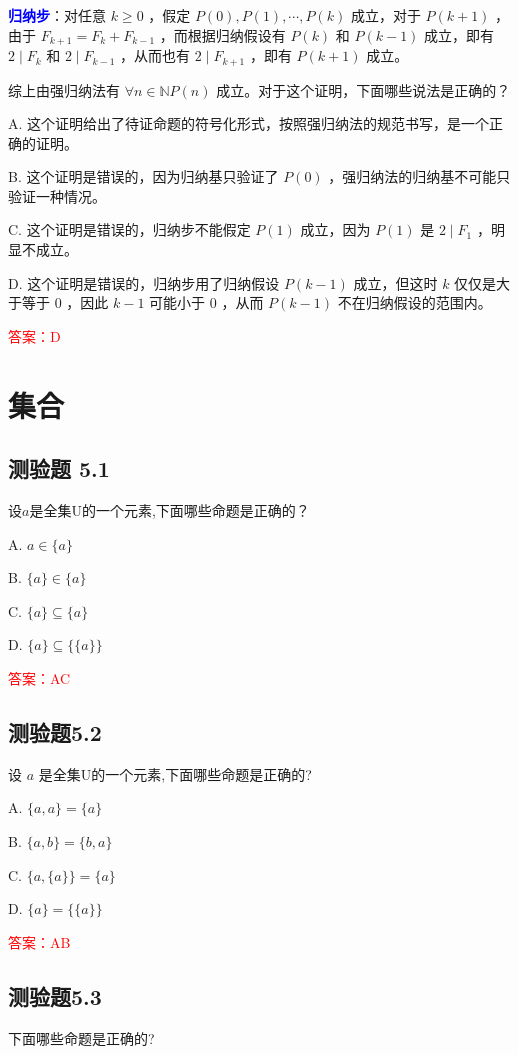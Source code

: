 \documentclass[UTF8, heading=true]{ctexart}
\begin{document}
\textcolor{blue}{\textbf{归纳步}}：对任意 $k \geq 0$ ，假定 $P(0), P(1), \cdots, P(k)$ 成立，对于 $P(k+1)$ ，由于 $F_{k+1}=F_k+F_{k-1}$ ，而根据归纳假设有 $P(k)$ 和 $P(k-1)$ 成立，即有 $2 \mid F_k$ 和 $2 \mid F_{k-1}$ ，从而也有 $2 \mid F_{k+1}$ ，即有 $P(k+1)$ 成立。

综上由强归纳法有 $\forall n \in \mathbb{N} P(n)$ 成立。对于这个证明，下面哪些说法是正确的？

A. 这个证明给出了待证命题的符号化形式，按照强归纳法的规范书写，是一个正确的证明。

B. 这个证明是错误的，因为归纳基只验证了 $P(0)$ ，强归纳法的归纳基不可能只验证一种情况。

C. 这个证明是错误的，归纳步不能假定 $P(1)$ 成立，因为 $P(1)$ 是 $2 \mid F_1$ ，明显不成立。

D. 
这个证明是错误的，归纳步用了归纳假设 $P(k-1)$ 成立，但这时 $k$ 仅仅是大于等于 0 ，因此 $k-1$ 可能小于 0 ，从而 $P(k-1)$ 不在归纳假设的范围内。

\textcolor{red}{答案：D}

\clearpage

\section{集合}

\subsection{测验题 5.1}
设$a$是全集U的一个元素,下面哪些命题是正确的？

A. $ a \in\{a\}$

B. $\{a\} \in\{a\}$

C. $\{a\} \subseteq\{a\}$

D. $\{a\} \subseteq\{\{a\}\}$

\textcolor{red}{答案：AC}

\subsection{测验题5.2}

设 $a$ 是全集U的一个元素,下面哪些命题是正确的?

A. $\{a, a\}=\{a\}$

B. $\{a, b\}=\{b, a\}$

C. $\{a,\{a\}\}=\{a\}$

D. $\{a\}=\{\{a\}\}$

\textcolor{red}{答案：AB}

\subsection{测验题5.3}
下面哪些命题是正确的?
\end{document}
